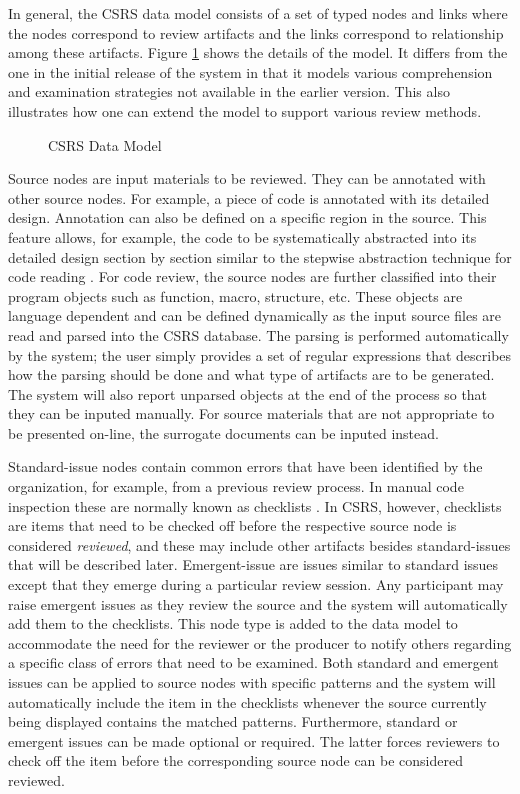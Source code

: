 In general, the CSRS data model consists of a set of typed nodes and
links where the nodes correspond to review artifacts and the links
correspond to relationship among these artifacts.  Figure
\ref{fig:data-model} shows the details of the model.  It differs from
the one in the initial release of the system \cite{Johnson93} in that
it models various comprehension and examination strategies not
available in the earlier version. This also illustrates how one can
extend the model to support various review methods.


\begin{figure}[tb]
  {\centerline{}}
  \caption{CSRS Data Model}
  \label{fig:data-model}
\end{figure}


Source nodes are input materials to be reviewed.  They can be
annotated with other source nodes. For example, a piece of code is
annotated with its detailed design.  Annotation can also be defined on
a specific region in the source.  This feature allows, for example,
the code to be systematically abstracted into its detailed design
section by section similar to the stepwise abstraction technique for
code reading \cite{Linger79}.  For code review, the source nodes are
further classified into their program objects such as function, macro,
structure, etc. These objects are language dependent and can be
defined dynamically as the input source files are read and parsed into
the CSRS database. The parsing is performed automatically by the
system; the user simply provides a set of regular expressions that
describes how the parsing should be done and what type of artifacts
are to be generated.  The system will also report unparsed objects at
the end of the process so that they can be inputed manually.  For
source materials that are not appropriate to be presented on-line, the
surrogate documents can be inputed instead.

Standard-issue nodes contain common errors that have been identified
by the organization, for example, from a previous review process.  In
manual code inspection these are normally known as checklists
\cite{Fagan76}. In CSRS, however, checklists are items that need to be
checked off before the respective source node is considered {\it
reviewed}, and these may include other artifacts besides
standard-issues that will be described later.  Emergent-issue are
issues similar to standard issues except that they emerge during a
particular review session.  Any participant may raise emergent issues
as they review the source and the system will automatically add them
to the checklists.  This node type is added to the data model to
accommodate the need for the reviewer or the producer to notify others
regarding a specific class of errors that need to be examined.  Both
standard and emergent issues can be applied to source nodes with
specific patterns and the system will automatically include the item
in the checklists whenever the source currently being displayed
contains the matched patterns.  Furthermore, standard or emergent
issues can be made optional or required. The latter forces reviewers
to check off the item before the corresponding source node can be
considered reviewed.


